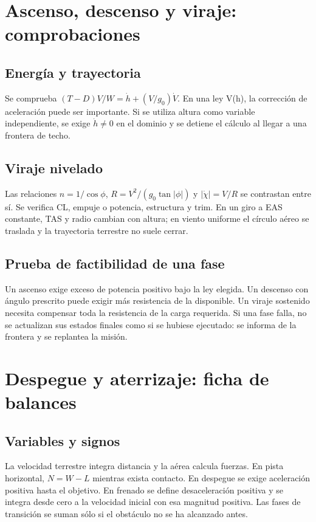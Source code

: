 \chapter{Ascenso, descenso y viraje: comprobaciones}
\section{Energía y trayectoria}
Se comprueba $(T-D)V/W=\dot h+(V/g_0)\dot V$. En una ley V(h), la corrección de aceleración puede ser importante. Si se utiliza altura como variable independiente, se exige $\dot h\neq0$ en el dominio y se detiene el cálculo al llegar a una frontera de techo.

\section{Viraje nivelado}
Las relaciones $n=1/\cos\phi$, $R=V^2/(g_0\tan|\phi|)$ y $|\dot\chi|=V/R$ se contrastan entre sí. Se verifica CL, empuje o potencia, estructura y trim. En un giro a EAS constante, TAS y radio cambian con altura; en viento uniforme el círculo aéreo se traslada y la trayectoria terrestre no suele cerrar.

\section{Prueba de factibilidad de una fase}
Un ascenso exige exceso de potencia positivo bajo la ley elegida. Un descenso con ángulo prescrito puede exigir más resistencia de la disponible. Un viraje sostenido necesita compensar toda la resistencia de la carga requerida. Si una fase falla, no se actualizan sus estados finales como si se hubiese ejecutado: se informa de la frontera y se replantea la misión.

\chapter{Despegue y aterrizaje: ficha de balances}
\section{Variables y signos}
La velocidad terrestre integra distancia y la aérea calcula fuerzas. En pista horizontal, $N=W-L$ mientras exista contacto. En despegue se exige aceleración positiva hasta el objetivo. En frenado se define desaceleración positiva y se integra desde cero a la velocidad inicial con esa magnitud positiva. Las fases de transición se suman sólo si el obstáculo no se ha alcanzado antes.

